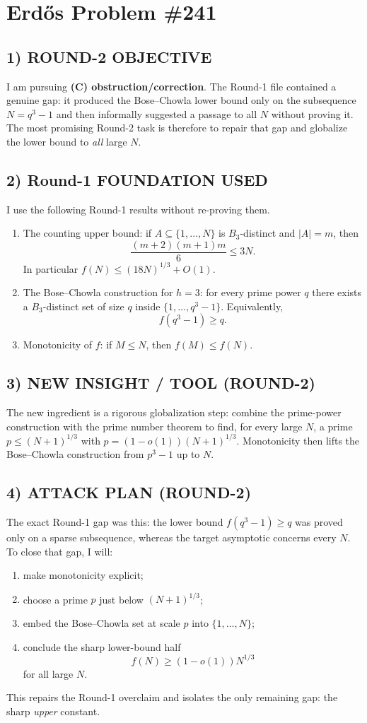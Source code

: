 \section{Erd\H{o}s Problem \#241}

\subsection*{1) ROUND-2 OBJECTIVE}
I am pursuing \textbf{(C) obstruction/correction}. The Round-1 file contained a genuine gap: it produced the Bose--Chowla lower bound only on the subsequence $N=q^3-1$ and then informally suggested a passage to all $N$ without proving it. The most promising Round-2 task is therefore to repair that gap and globalize the lower bound to \emph{all} large $N$.

\subsection*{2) Round-1 FOUNDATION USED}
I use the following Round-1 results without re-proving them.
\begin{enumerate}
\item The counting upper bound: if $A\subseteq\{1,\dots,N\}$ is $B_3$-distinct and $|A|=m$, then
\[
\frac{(m+2)(m+1)m}{6}\le 3N.
\]
In particular $f(N)\le (18N)^{1/3}+O(1)$.
\item The Bose--Chowla construction for $h=3$: for every prime power $q$ there exists a $B_3$-distinct set of size $q$ inside $\{1,\dots,q^3-1\}$. Equivalently,
\[
 f(q^3-1)\ge q.
\]
\item Monotonicity of $f$: if $M\le N$, then $f(M)\le f(N)$.
\end{enumerate}

\subsection*{3) NEW INSIGHT / TOOL (ROUND-2)}
The new ingredient is a rigorous globalization step: combine the prime-power construction with the prime number theorem to find, for every large $N$, a prime $p\le (N+1)^{1/3}$ with $p=(1-o(1))(N+1)^{1/3}$. Monotonicity then lifts the Bose--Chowla construction from $p^3-1$ up to $N$.

\subsection*{4) ATTACK PLAN (ROUND-2)}
The exact Round-1 gap was this: the lower bound $f(q^3-1)\ge q$ was proved only on a sparse subsequence, whereas the target asymptotic concerns every $N$. To close that gap, I will:
\begin{enumerate}
\item make monotonicity explicit;
\item choose a prime $p$ just below $(N+1)^{1/3}$;
\item embed the Bose--Chowla set at scale $p$ into $\{1,\dots,N\}$;
\item conclude the sharp lower-bound half
\[
 f(N)\ge (1-o(1))N^{1/3}
\]
for all large $N$.
\end{enumerate}
This repairs the Round-1 overclaim and isolates the only remaining gap: the sharp \emph{upper} constant.

